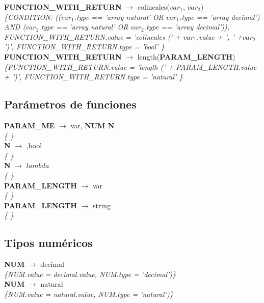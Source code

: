 \documentclass[10pt,a4paper]{article}
\begin{document}
\textbf{FUNCTION\_WITH\_RETURN} $\rightarrow$ colineales($var_{1}$, $var_{2}$)   \\
\textit{\{CONDITION: (($var_{1}$.type == 'array natural' OR $ var_{1}$.type == 'array decimal') AND
($var_{2}$.type == 'array natural' OR $var_{2}$.type == 'array decimal')), FUNCTION\_WITH\_RETURN.value =  'colineales (' + $var_{1}$.value + ', ' +$var_{2}$')', FUNCTION\_WITH\_RETURN.type = 'bool' \}} \\

\textbf{FUNCTION\_WITH\_RETURN} $\rightarrow$ length(\textbf{PARAM\_LENGTH}) \\
\textit{\{FUNCTION\_WITH\_RETURN.value =  'length (' + PARAM\_LENGTH.value + ')', FUNCTION\_WITH\_RETURN.type = 'natural' \}} \\

\subsection{Parámetros de funciones}
\textbf{PARAM\_ME} $\rightarrow$ var, \textbf{NUM N} \\
\textit{\{   \}} \\

\textbf{N} $\rightarrow$ ,bool \\
\textit{\{   \}} \\ 

\textbf{N} $\rightarrow$ $lambda$  \\
\textit{\{   \}} \\

\textbf{PARAM\_LENGTH} $\rightarrow$ var \\
\textit{\{   \}} \\

\textbf{PARAM\_LENGTH} $\rightarrow$ string \\
\textit{\{   \}} \\

\subsection{Tipos numéricos}
\textbf{NUM} $\rightarrow$ decimal \\
\textit{\{NUM.value = decimal.value, NUM.type = 'decimal')\}}  \\ 

\textbf{NUM} $\rightarrow$ natural \\
\textit{\{NUM.value = natural.value, NUM.type = 'natural')\}}  \\ 
\end{document}
